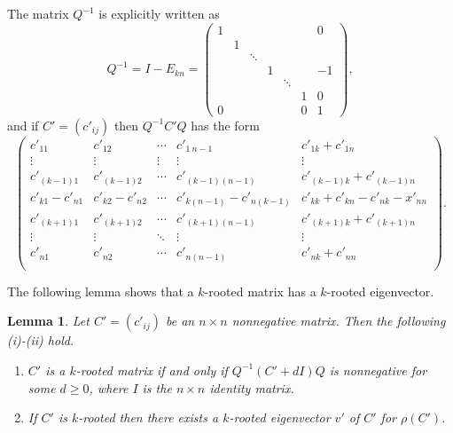 \documentclass[12pt, a4paper]{article}
\theoremstyle{plain}
\newtheorem{lem}[thm]{Lemma}
\theoremstyle{definition}
\begin{document}
The matrix $Q^{-1}$ is explicitly written as
    $$Q^{-1}=I-E_{kn}=
\begin{pmatrix}
1 &   &        &       &        &   & 0 \\
  & 1 &        &       &        &   &   \\
  &   & \ddots &       &        &   &   \\
  &   &        & 1     &        &   & -1 \\
  &   &        &       &\ddots  &   &  \\
  &   &        &       &        &1  & 0 \\
0 &   &        &       &        &0  & 1
\end{pmatrix},$$ 
and if $C'=(c'_{ij})$ then $Q^{-1}C'Q$ has the form 
\begin{equation}\label{e6}
\begin{pmatrix}
            c'_{11}     & c'_{12} & \cdots     & c'_{1\ n-1} & c'_{1k}+c'_{1n} \\
            \vdots      & \vdots  & \vdots     & \vdots      & \vdots\\
            c'_{(k-1) 1}   & c'_{(k-1)  2}           & \cdots     & c'_{(k-1) (n-1)} & c'_{(k-1) k}+c'_{(k-1) n} \\
            c'_{k1}-c'_{n1} & c'_{k2}-c'_{n2} &\cdots      &c'_{k (n-1)}-c'_{n (k-1)}& c'_{kk}+c'_{kn}-c'_{nk}-x'_{nn}\\
            c'_{(k+1) 1}   & c'_{(k+1) 2}           & \cdots     & c'_{(k+1) (n-1)} & c'_{(k+1) k}+c'_{(k+1)
             n} \\
            \vdots              & \vdots & \ddots              & \vdots & \vdots \\
            c'_{n1}     & c'_{n2} & \cdots             & c'_{n (n-1)} & c'_{nk}+c'_{nn} \\
        \end{pmatrix}.\end{equation}


The following lemma shows that a $k$-rooted matrix has a $k$-rooted eigenvector.


\begin{lem}\label{lma_m_rooted}
    Let $C'=(c'_{ij})$ be an $n\times n$ nonnegative matrix. Then the following (i)-(ii) hold.
        \begin{enumerate}[label=(\roman*)]
            \item \label{lma_m_rooted_cond1} $C'$ is a $k$-rooted matrix if and only if $Q^{-1}(C'+dI)Q$ is nonnegative for some $d\geq 0$, where $I$ is the $n\times n$ identity matrix. 
            \item \label{lma_m_rooted_cond2} If $C'$ is $k$-rooted then there exists a  $k$-rooted eigenvector $v'$ of $C'$  for $\rho(C')$.
        \end{enumerate}
\end{lem}
\end{document}
